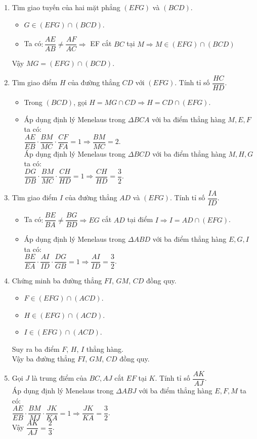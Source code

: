 \begin{bt}
{		\begin{enumerate}
			\item Tìm giao tuyến của hai mặt phẳng $(EFG)$ và $(BCD)$.
			\begin{itemize}
				\item $G \in (EFG) \cap (BCD)$.
				\item Ta có$\colon \dfrac{AE}{AB} \neq \dfrac{AF}{AC} \Rightarrow $ EF cắt $BC$ tại $M \Rightarrow M \in (EFG)\cap (BCD)$
			\end{itemize}
			Vậy $MG =(EFG)\cap (BCD)$.
			\item Tìm giao điểm $H$ của đường thẳng $CD$ với $(EFG)$. Tính tỉ số $\dfrac{HC}{HD}$.
			\begin{itemize}
				\item Trong $(BCD)$, gọi $H =MG \cap CD \Rightarrow H =CD \cap (EFG)$.
				\item Áp dụng định lý Menelaus trong $\Delta BCA$ với ba điểm thẳng hàng $M, E, F$ ta có$\colon$\\$\dfrac{AE}{EB}\cdot \dfrac{BM}{MC}\cdot \dfrac{CF}{FA}=1 \Rightarrow \dfrac{BM}{MC}=2$.
				\\Áp dụng định lý Menelaus trong $\Delta BCD$ với ba điểm thẳng hàng $M, H, G$ ta có$\colon$\\$\dfrac{DG}{DB}\cdot \dfrac{BM}{MC}\cdot \dfrac{CH}{HD}=1 \Rightarrow \dfrac{CH}{HD}=\dfrac{3}{2}$.
			\end{itemize}
			\item Tìm giao điểm $I$ của đường thẳng $AD$ và $(EFG)$. Tính tỉ số $\dfrac{IA}{ID}$.
			\begin{itemize}
				\item Ta có$\colon \dfrac{BE}{BA}\neq \dfrac{BG}{BD} \Rightarrow EG$ cắt $AD$ tại điểm $I \Rightarrow I = AD \cap (EFG)$.
				\item Áp dụng định lý Menelaus trong $\Delta ABD$ với ba điểm thẳng hàng $E, G, I$ ta có$\colon$\\$\dfrac{BE}{EA}\cdot \dfrac{AI}{ID}\cdot \dfrac{DG}{GB}=1 \Rightarrow \dfrac{AI}{ID}=\dfrac{3}{2}$.
			\end{itemize}
			\item Chứng minh ba đường thẳng $FI$, $GM$, $CD$ đồng quy.
			\begin{itemize}
				\item $F\in (EFG)\cap (ACD)$.
				\item $H \in (EFG)\cap (ACD)$.
				\item $I \in (EFG)\cap (ACD)$.
			\end{itemize}
			Suy ra ba điểm $F$, $H$, $I$ thẳng hàng.\\
			Vậy ba đường thẳng $FI$, $GM$, $CD$ đồng quy.
			\item Gọi $J$ là trung điểm của $BC, AJ$ cắt $EF$ tại $K$. Tính tỉ số $\dfrac{AK}{AJ}$.\\
			Áp dụng định lý Menelaus trong $\Delta ABJ$ với ba điểm thẳng hàng $E, F, M$ ta có$\colon$\\$\dfrac{AE}{EB}\cdot \dfrac{BM}{MJ}\cdot \dfrac{JK}{KA}=1 \Rightarrow \dfrac{JK}{KA}=\dfrac{3}{2}$.\\
			Vậy $\dfrac{AK}{AJ}=\dfrac{2}{3}$.
		\end{enumerate}
	}
	

\end{bt}
